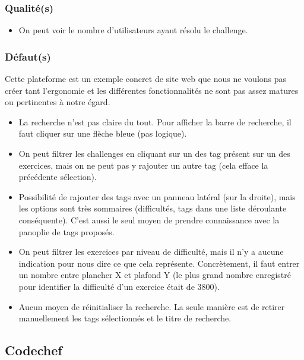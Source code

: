 \subsubsection*{Qualité(s)}

\begin{itemize}
    \item On peut voir le nombre d'utilisateurs ayant résolu le challenge.
\end{itemize}

\subsubsection*{Défaut(s)}

Cette plateforme est un exemple concret de site web que nous ne voulons pas créer tant l'ergonomie et les différentes fonctionnalités ne sont pas assez matures ou pertinentes à notre égard.\\

\begin{itemize}
    \item La recherche n'est pas claire du tout. Pour afficher la barre de recherche, il faut cliquer sur une flèche bleue (pas logique).
    \item On peut filtrer les challenges en cliquant sur un des \gls{tag} présent sur un des exercices, mais on ne peut pas y rajouter un autre \gls{tag} (cela efface la précédente sélection).
    \item Possibilité de rajouter des \glspl{tag} avec un panneau latéral (sur la droite), mais les options sont très sommaires (difficultés, \glspl{tag} dans une liste déroulante conséquente). C'est aussi le seul moyen de prendre connaissance avec la panoplie de \glspl{tag} proposés.
    \item On peut filtrer les exercices par niveau de difficulté, mais il n'y a aucune indication pour nous dire ce que cela représente. Concrètement, il faut entrer un nombre entre plancher X et plafond Y (le plus grand nombre enregistré pour identifier la difficulté d'un exercice était de 3800).
    \item Aucun moyen de réinitialiser la recherche. La seule manière est de retirer manuellement les \glspl{tag} sélectionnés et le titre de recherche.
\end{itemize}

\pagebreak
\subsection*{Codechef}

